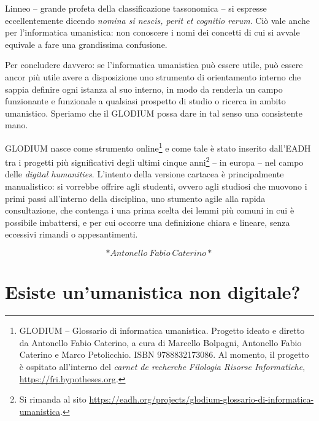 \documentclass[
  b5paper,
  twoside,
  12pt,
  chapterprefix=false,
  bibliography=totocnumbered,
  parskip=false]{scrbook}
\begin{document}
Linneo -- grande profeta della classificazione tassonomica -- si
espresse eccellentemente dicendo \emph{nomina si nescis, perit et cognitio
rerum}. Ciò vale anche per l'informatica umanistica: non conoscere i
nomi dei concetti di cui si avvale equivale a fare una grandissima
confusione.

Per concludere davvero: se l'informatica umanistica può essere utile,
può essere ancor più utile avere a disposizione uno strumento di
orientamento interno che sappia definire ogni istanza al suo interno, in
modo da renderla un campo funzionante e funzionale a qualsiasi prospetto
di studio o ricerca in ambito umanistico. Speriamo che il GLODIUM possa
dare in tal senso una consistente mano.

GLODIUM nasce come strumento online\footnote{GLODIUM -- Glossario di informatica umanistica. Progetto ideato e
  diretto da Antonello Fabio Caterino, a cura di Marcello Bolpagni,
  Antonello Fabio Caterino e Marco Petolicchio. ISBN 9788832173086. Al
  momento, il progetto è ospitato all'interno del \emph{carnet de
  recherche} \emph{Filologia Risorse Informatiche},
  \url{https://fri.hypotheses.org}.} e come tale è stato inserito
dall'EADH tra i progetti più significativi degli ultimi cinque anni\footnote{Si rimanda al sito
  \url{https://eadh.org/projects/glodium-glossario-di-informatica-umanistica}.}
-- in europa -- nel campo delle \emph{digital humanities}. L'intento della
versione cartacea è principalmente manualistico: si vorrebbe offrire
agli studenti, ovvero agli studiosi che muovono i primi passi
all'interno della disciplina, uno stumento agile alla rapida
consultazione, che contenga i una prima scelta dei lemmi più comuni in
cui è possibile imbattersi, e per cui occorre una definizione chiara e
lineare, senza eccessivi rimandi o appesantimenti.

\[*Antonello~Fabio~Caterino*\]

\hypertarget{esiste-unumanistica-non-digitale}{%
\chapter*{Esiste un'umanistica non digitale?}\label{esiste-unumanistica-non-digitale}}

\end{document}
